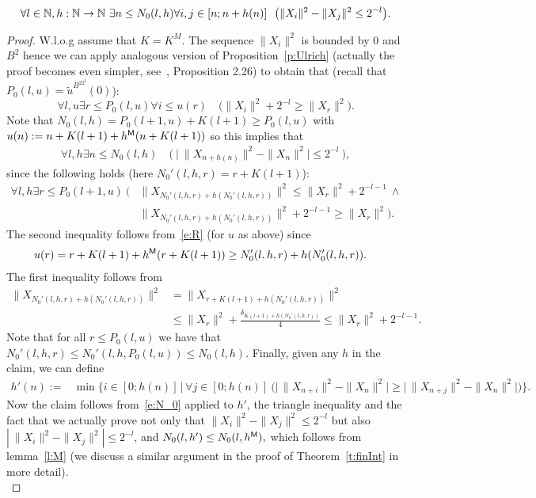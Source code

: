 \begin{lemma}[$N_0$ is correct]\label{l:N0}
\[
\forall l\in\mathbb{N},h:\mathbb{N}\to\mathbb{N}\ \exists n \leq N_0(l,h) \forall i,j\in[n;n+h(n)]\ \ \big(\|X_i\|^2-\|X_j\|^2\leq 2^{-l}\big).
\]
\end{lemma}
\begin{proof}
W.l.o.g assume that $K=K^M$. The sequence $\|X_i\|^2$ is bounded by $0$ and $B^2$ hence we can apply analogous version of
Proposition~\ref{p:Ulrich} (actually the proof becomes even simpler, see~\cite{Kohlenbach08}, Proposition 2.26)
to obtain that (recall that $P_0(l,u)=\tilde u^{B^22^l}(0)$):
\[ \forall l,u \exists r\leq P_0(l,u) \forall i\leq u(r) 
	\quad \big( \|X_{i}\|^2 + 2^{-l}\geq \|X_{r}\|^2\big)\tag{R}\label{e:R}.\]
Note that $N_0(l,h)=P_0(l+1,u)+K(l+1)\geq P_0(l,u)$ with $ u(n):=n + K(l+1)+ h\protect{^{\textsf{\upshape M}}}(n + K(l+1))$ so this implies that
\begin{align*}
\forall l,h \exists n\leq N_0(l,h) \quad  \Big(\ \big|\ \|X_{n+h(n)}\|^2 - \|X_{n}\|^2\big| \leq 2^{-l}\ \Big),  \tag{N0}\label{e:N_0} 
\end{align*}
since the following holds (here $N_0'(l,h,r) = r+K(l+1)$):
\begin{align*}
\forall l,h \exists r\leq P_0(l+1,u)\ \big(
		  & \|X_{N_0'(l,h,r)+h(N_0'(l,h,r))}\|^2\leq \|X_{r}\|^2 + 2^{-l-1}\ \wedge\\
		  & \|X_{N_0'(l,h,r)+h(N_0'(l,h,r))}\|^2 + 2^{-l-1}\geq \|X_{r}\|^2 \big).
\end{align*}
The second inequality follows from~\eqref{e:R} (for $u$ as above) since
\begin{align*}
u(r)&= r + K(l+1) + h\protect{^{\textsf{\upshape M}}}(r + K(l+1)) \geq N_0'(l,h,r)+h(N_0'(l,h,r)).
\end{align*}
The first inequality follows from
\begin{align*}
\|X_{N_0'(l,h,r)+h(N_0'(l,h,r))}\|^2&=\|X_{r+K(l+1)+h(N_0'(l,h,r))}\|^2\\
&\leq\|X_{r}\|^2+\frac{\delta_{K(l+1)+h(N_0'(l,h,r))}}{4}\leq\|X_{r}\|^2 + 2^{-l-1}.
\end{align*}
Note that for all $r\leq P_0(l,u)$ we have that $N_0'(l,h,r)\leq N_0'(l,h,P_0(l,u)) \leq N_0(l,h)$.
Finally, given any $h$ in the claim, we can define 
\begin{align*}
h'(n):=&\min\Big\{ i\in [0;h(n)]\, \Big|\, 
 \forall j\in[0;h(n)]\ \Big(\big|\, \|X_{n+i}\|^2 - \|X_n\|^2 \big| \geq \big|\, \|X_{n+j}\|^2- \|X_n\|^2 \big|\Big) \Big\}.
\end{align*}
Now the claim follows from~\eqref{e:N_0} applied to $h'$, the triangle inequality and the fact
that we actually prove not only that  
$\|X_{i}\|^2 - \|X_j\|^2\leq 2^{-l}$ 
but also
$|\ \|X_{i}\|^2 - \|X_j\|^2 |\leq 2^{-l}$, and 
$
N_0(l,h')\leq N_0(l,h\protect{^{\textsf{\upshape M}}}),
$
which follows from lemma~\ref{l:M} (we discuss a similar argument in the proof of Theorem~\ref{t:finInt} in more detail). \\
\end{proof}

